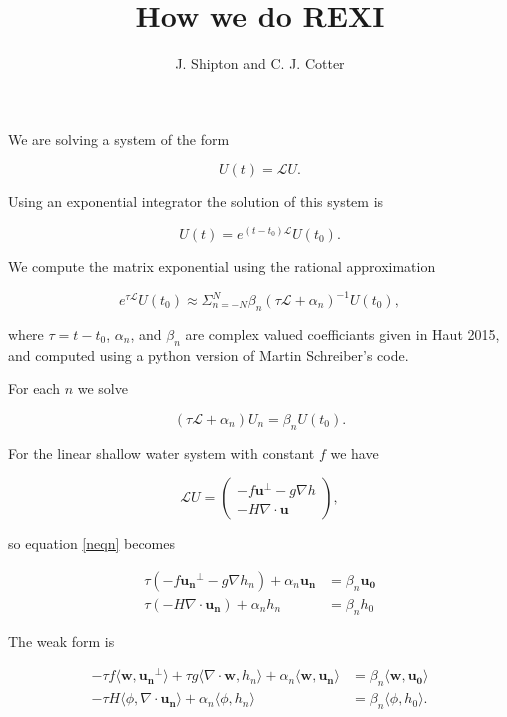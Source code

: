 \documentclass[14pt]{article}
\title{How we do REXI}
\author{J. Shipton and C. J. Cotter}
\def\MM#1{\boldsymbol{#1}}
\begin{document}
We are solving a system of the form

\begin{equation}
U(t) = \mathcal{L}U.
\end{equation}

Using an exponential integrator the solution of this system is

\begin{equation}
U(t) = e^{(t-t_0)\mathcal{L}}U(t_0).
\end{equation}

We compute the matrix exponential using the rational approximation

\begin{equation}
  e^{\tau\mathcal{L}}U(t_0) \approx \Sigma_{n=-N}^N\beta_n(\tau\mathcal{L} + \alpha_n)^{-1}U(t_0),
\end{equation}

\noindent where $\tau = t-t_0$, $\alpha_n$, and $\beta_n$ are complex
valued coefficiants given in Haut 2015, and computed using a python
version of Martin Schreiber's code.

For each $n$ we solve

\begin{equation}\label{neqn}
(\tau\mathcal{L} + \alpha_n)U_n = \beta_nU(t_0).
\end{equation}

For the linear shallow water system with constant $f$ we have

\begin{equation}
  \mathcal{L}U =
  \begin{pmatrix}
    -f\MM{u}^\perp - g\nabla h \\
    -H\nabla\cdot\MM{u}
  \end{pmatrix},
\end{equation}

\noindent so equation \ref{neqn} becomes

\begin{align}
  \tau(-f\MM{u_n}^\perp - g\nabla h_n) + \alpha_n\MM{u_n} &= \beta_n\MM{u_0}\\
  \tau(-H\nabla\cdot\MM{u_n}) + \alpha_nh_n &= \beta_nh_0
\end{align}

The weak form is

\begin{align}
  -\tau f\langle\MM{w}, \MM{u_n}^\perp\rangle + \tau g\langle\nabla\cdot\MM{w}, h_n\rangle + \alpha_n\langle\MM{w}, \MM{u_n}\rangle &= \beta_n\langle\MM{w}, \MM{u_0}\rangle \label{weak u}\\
  -\tau H\langle\phi, \nabla\cdot\MM{u_n}\rangle + \alpha_n\langle\phi, h_n\rangle &= \beta_n\langle\phi, h_0\rangle. \label{weak h}
\end{align}
\end{document}
